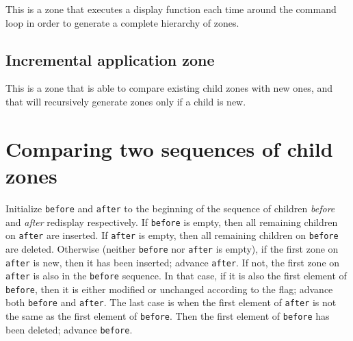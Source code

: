 \documentclass{report}
\def\code#1{\texttt{#1}}
\begin{document}
This is a zone that executes a display function each time around the
command loop in order to generate a complete hierarchy of zones.

\section{Incremental application zone}

This is a zone that is able to compare existing child zones with
new ones, and that will recursively generate zones only if a child
is new. 

\chapter{Comparing two sequences of child zones}

Initialize \code{before} and \code{after} to the beginning of the
sequence of children \emph{before} and \emph{after} redisplay
respectively.  If \code{before} is empty, then all remaining children
on \code{after} are inserted.  If \code{after} is empty, then all
remaining children on \code{before} are deleted.  Otherwise (neither
\code{before} nor \code{after} is empty), if the first zone on
\code{after} is new, then it has been inserted; advance \code{after}.
If not, the first zone  on \code{after} is also in the \code{before}
sequence.  In that case, if it is also the first element of
\code{before}, then it is either modified or unchanged according to
the flag; advance both \code{before} and \code{after}.  The last case
is when the first element of \code{after} is not the same as the first
element of \code{before}.  Then the first element of \code{before} has
been deleted; advance \code{before}. 
\end{document}
